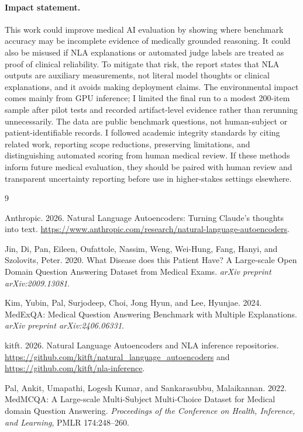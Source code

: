 \documentclass{article}
\begin{document}
\paragraph{Impact statement.}
This work could improve medical AI evaluation by showing where benchmark accuracy may be incomplete evidence of medically grounded reasoning. It could also be misused if NLA explanations or automated judge labels are treated as proof of clinical reliability. To mitigate that risk, the report states that NLA outputs are auxiliary measurements, not literal model thoughts or clinical explanations, and it avoids making deployment claims. The environmental impact comes mainly from GPU inference; I limited the final run to a modest 200-item sample after pilot tests and recorded artifact-level evidence rather than rerunning unnecessarily. The data are public benchmark questions, not human-subject or patient-identifiable records. I followed academic integrity standards by citing related work, reporting scope reductions, preserving limitations, and distinguishing automated scoring from human medical review. If these methods inform future medical evaluation, they should be paired with human review and transparent uncertainty reporting before use in higher-stakes settings elsewhere.

{\small
\begin{thebibliography}{9}

Anthropic. 2026.
\newblock Natural Language Autoencoders: Turning Claude's thoughts into text.
\newblock \url{https://www.anthropic.com/research/natural-language-autoencoders}.

Jin, Di, Pan, Eileen, Oufattole, Nassim, Weng, Wei-Hung, Fang, Hanyi, and Szolovits, Peter. 2020.
\newblock What Disease does this Patient Have? A Large-scale Open Domain Question Answering Dataset from Medical Exams.
\newblock \emph{arXiv preprint arXiv:2009.13081}.

Kim, Yubin, Pal, Surjodeep, Choi, Jong Hyun, and Lee, Hyunjae. 2024.
\newblock MedExQA: Medical Question Answering Benchmark with Multiple Explanations.
\newblock \emph{arXiv preprint arXiv:2406.06331}.

kitft. 2026.
\newblock Natural Language Autoencoders and NLA inference repositories.
\newblock \url{https://github.com/kitft/natural_language_autoencoders} and \url{https://github.com/kitft/nla-inference}.

Pal, Ankit, Umapathi, Logesh Kumar, and Sankarasubbu, Malaikannan. 2022.
\newblock MedMCQA: A Large-scale Multi-Subject Multi-Choice Dataset for Medical domain Question Answering.
\newblock \emph{Proceedings of the Conference on Health, Inference, and Learning}, PMLR 174:248--260.

\end{thebibliography}
}
\end{document}
